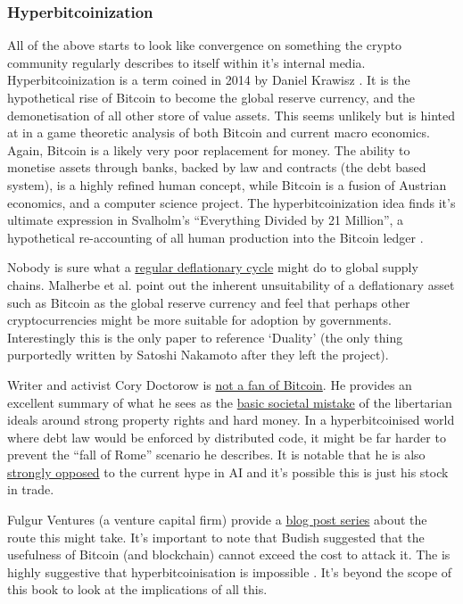 \subsubsection{Hyperbitcoinization}
All of the above starts to look like convergence on something the crypto community regularly describes to itself within it's internal media. Hyperbitcoinization is a term coined in 2014 by Daniel Krawisz \cite{krawisz2014hyperbitcoinization}. It is the hypothetical rise of Bitcoin to become the global reserve currency, and the demonetisation of all other store of value assets. This seems unlikely but is hinted at in a game theoretic analysis of both Bitcoin and current macro economics. Again, Bitcoin is a likely very poor replacement for money. The ability to monetise assets through banks, backed by law and contracts (the debt based system), is a highly refined human concept, while Bitcoin is a fusion of Austrian economics, and a computer science project. The hyperbitcoinization idea finds it's ultimate expression in Svalholm's ``Everything Divided by 21 Million'', a hypothetical re-accounting of all human production into the Bitcoin ledger \cite{booth2022bitcoin}.\par
Nobody is sure what a \href{https://fredblog.stlouisfed.org/2022/07/inflation-and-deflation-with-a-fixed-money-supply/}{regular deflationary cycle} might do to global supply chains. Malherbe et al. point out the inherent unsuitability of a deflationary asset such as Bitcoin as the global reserve currency \cite{malherbe2019cryptocurrencies} and feel that perhaps other cryptocurrencies might be more suitable for adoption by governments.  Interestingly this is the only paper to reference `Duality' (the only thing purportedly written by Satoshi Nakamoto after they left the project). \par
Writer and activist Cory Doctorow is \href{https://onezero.medium.com/the-byzantine-premium-8411521db843}{not a fan of Bitcoin}. He provides an excellent summary of what he sees as the \href{https://doctorow.medium.com/finance-caused-the-fall-of-rome-fd091fa02973}{basic societal mistake} of the libertarian ideals around strong property rights and hard money. In a hyperbitcoinised world where debt law would be enforced by distributed code, it might be far harder to prevent the ``fall of Rome'' scenario he describes. It is notable that he is also \href{https://pluralistic.net/2023/03/09/autocomplete-worshippers/#the-real-ai-was-the-corporations-that-we-fought-along-the-way}{strongly opposed} to the current hype in AI and it's possible this is just his stock in trade.\par  
Fulgur Ventures (a venture capital firm) provide a \href{https://medium.com/@fulgur.ventures/the-roads-to-hyperbitcoinization-part-1-27dc84d0e5e5}{blog post series} about the route this might take. It's important to note that Budish suggested that the usefulness of Bitcoin (and blockchain) cannot exceed the cost to attack it. The is highly suggestive that hyperbitcoinisation is impossible \cite{budish2018economic}. It's beyond the scope of this book to look at the implications of all this. 

